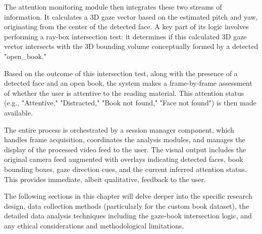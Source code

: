 The attention monitoring module then integrates these two streams of information. It calculates a 3D gaze vector based on the estimated pitch and yaw, originating from the center of the detected face. A key part of its logic involves performing a ray-box intersection test: it determines if this calculated 3D gaze vector intersects with the 3D bounding volume conceptually formed by a detected "open\_book."

Based on the outcome of this intersection test, along with the presence of a detected face and an open book, the system makes a frame-by-frame assessment of whether the user is attentive to the reading material. This attention status (e.g., "Attentive," "Distracted," "Book not found," "Face not found") is then made available.

The entire process is orchestrated by a session manager component, which handles frame acquisition, coordinates the analysis modules, and manages the display of the processed video feed to the user. The visual output includes the original camera feed augmented with overlays indicating detected faces, book bounding boxes, gaze direction cues, and the current inferred attention status. This provides immediate, albeit qualitative, feedback to the user.

The following sections in this chapter will delve deeper into the specific research design, data collection methods (particularly for the custom book dataset), the detailed data analysis techniques including the gaze-book intersection logic, and any ethical considerations and methodological limitations.


